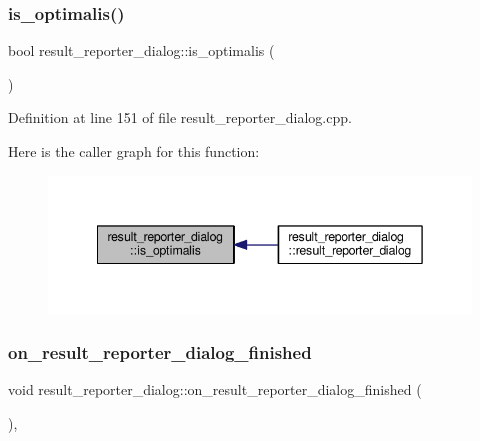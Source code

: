 \subsubsection{\texorpdfstring{is\+\_\+optimalis()}{is\_optimalis()}}
{\footnotesize\ttfamily bool result\+\_\+reporter\+\_\+dialog\+::is\+\_\+optimalis (\begin{DoxyParamCaption}{ }\end{DoxyParamCaption})\hspace{0.3cm}{\ttfamily [private]}}



Definition at line 151 of file result\+\_\+reporter\+\_\+dialog.\+cpp.

Here is the caller graph for this function\+:\nopagebreak
\begin{figure}[H]
\begin{center}
\leavevmode
\includegraphics[width=342pt]{classresult__reporter__dialog_a8a8acd3370d0fb4a8a3233f90988edd2_icgraph}
\end{center}
\end{figure}
\mbox{\label{classresult__reporter__dialog_a44fa6d948ee0119ea33c9581b3047463}} 
\subsubsection{\texorpdfstring{on\+\_\+result\+\_\+reporter\+\_\+dialog\+\_\+finished}{on\_result\_reporter\_dialog\_finished}\hspace{0.1cm}{\footnotesize\ttfamily [1/2]}}
{\footnotesize\ttfamily void result\+\_\+reporter\+\_\+dialog\+::on\+\_\+result\+\_\+reporter\+\_\+dialog\+\_\+finished (\begin{DoxyParamCaption}{ }\end{DoxyParamCaption})\hspace{0.3cm}{\ttfamily [private]}, {\ttfamily [slot]}}



